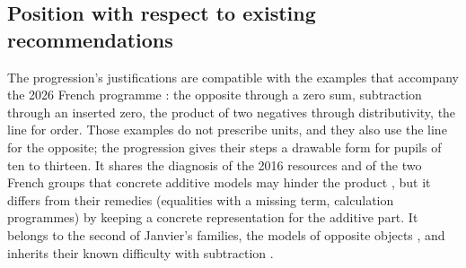 \documentclass[11pt,a4paper]{article}
\theoremstyle{definition}
\begin{document}
\subsection{Position with respect to existing recommendations}
The progression's justifications are compatible with the examples that accompany the 2026 French programme \citep{MEN2026Exemples}: the opposite through a zero sum, subtraction through an inserted zero, the product of two negatives through distributivity, the line for order. Those examples do not prescribe units, and they also use the line for the opposite; the progression gives their steps a drawable form for pupils of ten to thirteen. It shares the diagnosis of the 2016 resources and of the two French groups that concrete additive models may hinder the product \citep{Eduscol2016Relatifs,IREMAquitaine2008,Matheron2016}, but it differs from their remedies (equalities with a missing term, calculation programmes) by keeping a concrete representation for the additive part. It belongs to the second of Janvier's families, the models of opposite objects \citep{Janvier1985}, and inherits their known difficulty with subtraction \citep{Janvier1985,Vig2014,NurnbergerHaag2015PMENA}.
\end{document}
